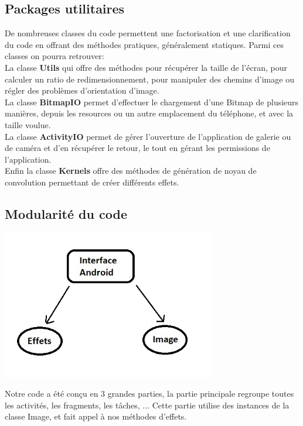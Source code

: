 \subsection{Packages utilitaires}
De nombreuses classes du code permettent une factorisation et une clarification du code en offrant des méthodes pratiques, généralement statiques. Parmi ces classes on pourra retrouver:
\\

La classe \textbf{Utils} qui offre des méthodes pour récupérer la taille de l'écran, pour calculer un ratio de redimensionnement, pour manipuler des chemins d'image ou régler des problèmes d'orientation d'image.
\\

La classe \textbf{BitmapIO} permet d'effectuer le chargement d'une Bitmap de plusieurs manières, depuis les resources ou un autre emplacement du téléphone, et avec la taille voulue.
\\

La classe \textbf{ActivityIO} permet de gérer l'ouverture de l'application de galerie ou de caméra et d'en récupérer le retour, le tout en gérant les permissions de l'application.
\\

Enfin la classe \textbf{Kernels} offre des méthodes de génération de noyau de convolution permettant de créer différents effets.
\\

\subsection{Modularité du code}
\begin{center}
    \includegraphics[width=0.7\textwidth]{report_src/structure.jpg}
\end{center}
Notre code a été conçu en 3 grandes parties, la partie principale regroupe toutes les activités, les fragments, les tâches, ... Cette partie utilise des instances de la classe Image, et fait appel à nos méthodes d'effets.
\\

